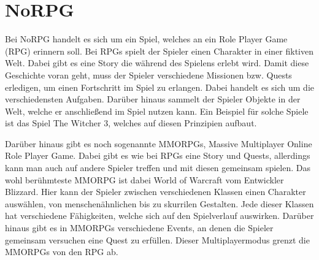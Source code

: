 \chapter{NoRPG}


		
		
Bei NoRPG handelt es sich um ein Spiel, welches an ein Role Player Game (RPG) erinnern soll. Bei RPGs spielt der Spieler einen Charakter in einer fiktiven Welt. Dabei gibt es eine Story die während des Spielens erlebt wird. Damit diese Geschichte voran geht, muss der Spieler verschiedene Missionen bzw. Quests erledigen, um einen Fortschritt im Spiel zu erlangen. Dabei handelt es sich um die verschiedensten Aufgaben. Darüber hinaus sammelt der Spieler Objekte in der Welt, welche er anschließend im Spiel nutzen kann. Ein Beispiel für solche Spiele ist das Spiel The Witcher 3, welches auf diesen Prinzipien aufbaut. %
	
Darüber hinaus gibt es noch sogenannte MMORPGs, Massive Multiplayer Online Role Player Game. Dabei gibt es wie bei RPGs eine Story und Quests, allerdings kann man auch auf andere Spieler treffen und mit diesen gemeinsam spielen. Das wohl berühmteste MMORPG ist dabei World of Warcraft %
vom Entwickler Blizzard. Hier kann der Spieler zwischen verschiedenen Klassen einen Charakter auswählen, von menschenähnlichen bis zu skurrilen Gestalten. Jede dieser Klassen hat verschiedene Fähigkeiten, welche sich auf den Spielverlauf auswirken. Darüber hinaus gibt es in MMORPGs verschiedene Events, an denen die Spieler gemeinsam versuchen eine Quest zu erfüllen. Dieser Multiplayermodus grenzt die MMORPGs von den RPG ab.

